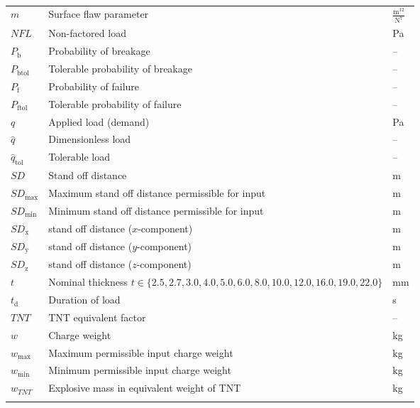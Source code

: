 \documentclass[12pt]{article}
\begin{document}
\begin{longtabu}{l X[l] l}
\\
$m$ & Surface flaw parameter & $\frac{\text{m}^{12}}{\text{N}^{7}}$
\\
$NFL$ & Non-factored load & Pa
\\
${P_{\text{b}}}$ & Probability of breakage & --
\\
${P_{\text{b}\text{tol}}}$ & Tolerable probability of breakage & --
\\
${P_{\text{f}}}$ & Probability of failure & --
\\
${P_{\text{f}\text{tol}}}$ & Tolerable probability of failure & --
\\
$q$ & Applied load (demand) & Pa
\\
$\hat{q}$ & Dimensionless load & --
\\
${\hat{q}_{\text{tol}}}$ & Tolerable load & --
\\
$SD$ & Stand off distance & m
\\
${SD_{\text{max}}}$ & Maximum stand off distance permissible for input & m
\\
${SD_{\text{min}}}$ & Minimum stand off distance permissible for input & m
\\
${SD_{\text{x}}}$ & stand off distance ($x$-component) & m
\\
${SD_{\text{y}}}$ & stand off distance ($y$-component) & m
\\
${SD_{\text{z}}}$ & stand off distance ($z$-component) & m
\\
$t$ & Nominal thickness $t\in{}\{2.5,2.7,3.0,4.0,5.0,6.0,8.0,10.0,12.0,16.0,19.0,22.0\}$ & mm
\\
${t_{\text{d}}}$ & Duration of load & s
\\
$TNT$ & TNT equivalent factor & --
\\
$w$ & Charge weight & kg
\\
${w_{\text{max}}}$ & Maximum permissible input charge weight & kg
\\
${w_{\text{min}}}$ & Minimum permissible input charge weight & kg
\\
${w_{TNT}}$ & Explosive mass in equivalent weight of TNT & kg
\\
\bottomrule
\caption{}
\label{Table:ToS}
\end{longtabu}
\end{document}
